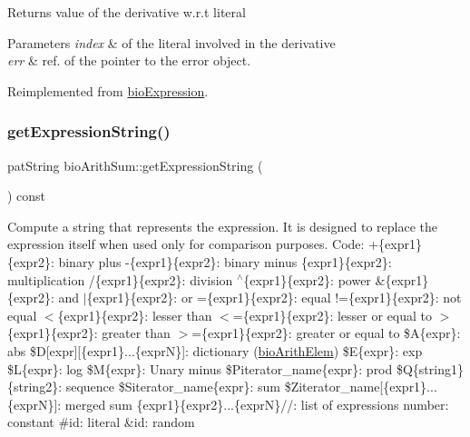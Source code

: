 \begin{DoxyReturn}{Returns}
value of the derivative w.\+r.\+t literal 
\end{DoxyReturn}

\begin{DoxyParams}{Parameters}
{\em index} & of the literal involved in the derivative \\
\hline
{\em err} & ref. of the pointer to the error object. \\
\hline
\end{DoxyParams}


Reimplemented from \hyperlink{classbio_expression_a5915579d1193f25f216c1e273c97f2ce}{bio\+Expression}.

\mbox{\label{classbio_arith_sum_ade9e163192f4124f802daf463d27faa4}} 
\subsubsection{\texorpdfstring{get\+Expression\+String()}{getExpressionString()}\hspace{0.1cm}{\footnotesize\ttfamily [1/4]}}
{\footnotesize\ttfamily pat\+String bio\+Arith\+Sum\+::get\+Expression\+String (\begin{DoxyParamCaption}{ }\end{DoxyParamCaption}) const\hspace{0.3cm}{\ttfamily [virtual]}}

Compute a string that represents the expression. It is designed to replace the expression itself when used only for comparison purposes. Code\+: +\{expr1\}\{expr2\}\+: binary plus -\/\{expr1\}\{expr2\}\+: binary minus \{expr1\}\{expr2\}\+: multiplication /\{expr1\}\{expr2\}\+: division $^\wedge$\{expr1\}\{expr2\}\+: power \&\{expr1\}\{expr2\}\+: and $\vert$\{expr1\}\{expr2\}\+: or =\{expr1\}\{expr2\}\+: equal !=\{expr1\}\{expr2\}\+: not equal $<$\{expr1\}\{expr2\}\+: lesser than $<$=\{expr1\}\{expr2\}\+: lesser or equal to $>$\{expr1\}\{expr2\}\+: greater than $>$=\{expr1\}\{expr2\}\+: greater or equal to \$A\{expr\}\+: abs \$D\mbox{[}expr\mbox{]}\mbox{[}\{expr1\}...\{exprN\}\mbox{]}\+: dictionary (\hyperlink{classbio_arith_elem}{bio\+Arith\+Elem}) \$E\{expr\}\+: exp \$L\{expr\}\+: log \$M\{expr\}\+: Unary minus \$\+Piterator\+\_\+name\{expr\}\+: prod \$Q\{string1\}\{string2\}\+: sequence \$\+Siterator\+\_\+name\{expr\}\+: sum \$\+Ziterator\+\_\+name\mbox{[}\{expr1\}...\{exprN\}\mbox{]}\+: merged sum \{expr1\}\{expr2\}...\{exprN\}//\+: list of expressions number\+: constant \#id\+: literal \&id\+: random 

